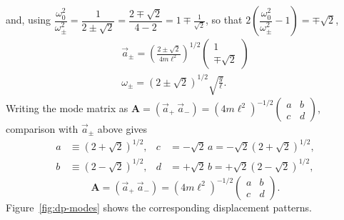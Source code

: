 \documentclass[11pt]{article}
\newcommand{\bA}{\mathbf{A}}
\begin{document}
and, using $\dfrac{\omega_0^2}{\omega_\pm^2}=\dfrac{1}{2\pm\sqrt2}=\dfrac{2\mp\sqrt2}{4-2}=1\mp\tfrac1{\sqrt2}$, so that $2\left(\dfrac{\omega_0^2}{\omega_\pm^2}-1\right)=\mp\sqrt2$,
\begin{gather}
\boxed{\vec a_\pm = \left(\frac{2\pm\sqrt2}{4m\ell^2}\right)^{1/2}\begin{pmatrix}1\\\mp\sqrt2\end{pmatrix}}\\
\boxed{\omega_\pm = (2\pm\sqrt2)^{1/2}\sqrt{\frac{g}{\ell}}.}
\end{gather}
Writing the mode matrix as $\bA = (\vec a_+\ \vec a_-) = (4m\ell^2)^{-1/2}\begin{pmatrix}a&b\\c&d\end{pmatrix}$, comparison with $\vec a_\pm$ above gives
\begin{align}
a&\equiv(2+\sqrt2)^{1/2}, & c&=-\sqrt2\,a = -\sqrt2(2+\sqrt2)^{1/2},\\
b&\equiv(2-\sqrt2)^{1/2}, & d&=+\sqrt2\,b=+\sqrt2(2-\sqrt2)^{1/2},
\end{align}
\begin{equation}
\boxed{\bA = (\vec a_+\ \vec a_-) = (4m\ell^2)^{-1/2}\begin{pmatrix}a&b\\c&d\end{pmatrix}.}
\label{eq:dp-modematrix}
\end{equation}
Figure~\ref{fig:dp-modes} shows the corresponding displacement patterns.
\end{document}
